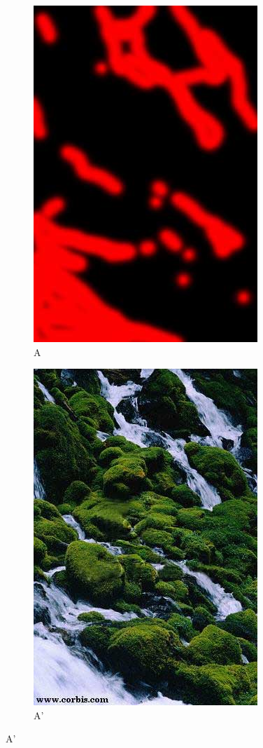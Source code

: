 \documentclass{article}
\begin{document}
\begin{figure}[!ht]
\begin{subfigure}{0.5\textwidth}
\centering
\includegraphics[width=0.75\linewidth]{waterfall-mask.jpg}
\caption{A}
\end{subfigure}
\begin{subfigure}{0.5\textwidth}
\centering
\includegraphics[width=0.75\linewidth]{waterfall.jpg}
\caption{A'}
\end{subfigure}
\end{figure}
\end{document}
